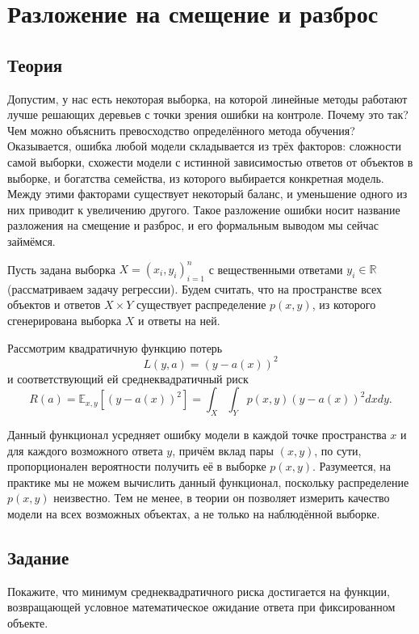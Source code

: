 \section*{Разложение на смещение и разброс}


\subsection*{Теория}

Допустим, у нас есть некоторая выборка, на которой линейные методы работают лучше решающих деревьев с точки зрения ошибки на контроле. Почему это так? Чем можно объяснить превосходство определённого метода обучения? Оказывается, ошибка любой модели складывается из трёх факторов: сложности самой выборки, схожести модели с истинной зависимостью ответов от объектов в выборке, и богатства семейства, из которого выбирается конкретная модель. Между этими факторами существует некоторый баланс, и уменьшение одного из них приводит к увеличению другого. Такое разложение ошибки носит название разложения на смещение и разброс, и его формальным выводом мы сейчас займёмся.

\vspace*{0.4cm}

Пусть задана выборка $X = (x_i, y_i)_{i=1}^n$ с вещественными ответами $y_i \in \mathbb{R}$ (рассматриваем задачу регрессии). Будем считать, что на пространстве всех объектов и ответов $X \times Y$ существует распределение $p(x, y)$, из которого сгенерирована выборка $X$ и ответы на ней.

Рассмотрим квадратичную функцию потерь
\[
    L(y, a) = (y - a(x))^2
\]
и соответствующий ей среднеквадратичный риск
\[
    R(a) = \mathbb{E}_{x, y} \left[ (y - a(x))^2 \right] = \int_{X} \int_{Y} p(x, y) (y - a(x))^2 dxdy.
\]

Данный функционал усредняет ошибку модели в каждой точке пространства $x$ и для каждого возможного ответа $y$, причём вклад пары $(x, y)$, по сути, пропорционален вероятности получить её в выборке $p(x, y)$. Разумеется, на практике мы не можем вычислить данный функционал, поскольку распределение $p(x, y)$ неизвестно. Тем не менее, в теории он позволяет измерить качество модели на всех возможных объектах, а не только на наблюдённой выборке.

\subsection*{Задание}

Покажите, что минимум среднеквадратичного риска достигается на функции, возвращающей условное математическое ожидание ответа при фиксированном объекте.

